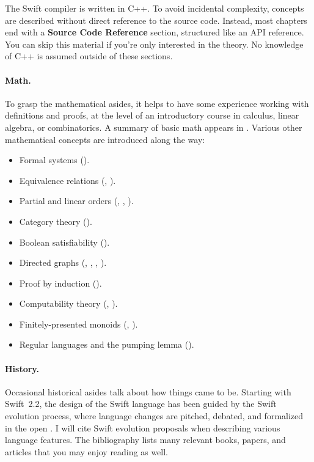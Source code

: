 \documentclass[../generics]{subfiles}
\begin{document}
The Swift compiler is written in C++. To avoid incidental complexity, concepts are described without direct reference to the source code. Instead, most chapters end with a \textbf{Source Code Reference} section, structured like an API reference. You can skip this material if you're only interested in the theory. No knowledge of C++ is assumed outside of these sections.

\paragraph{Math.}
To grasp the mathematical asides, it helps to have some experience working with definitions and proofs, at the level of an introductory course in calculus, linear algebra, or combinatorics. A summary of basic math appears in . Various other mathematical concepts are introduced along the way:
\begin{itemize}
\item Formal systems ().
\item Equivalence relations (, ).
\item Partial and linear orders (, , ).
\item Category theory ().
\item Boolean satisfiability ().
\item Directed graphs (, , , ).
\item Proof by induction ().
\item Computability theory (, ).
\item Finitely-presented monoids (, ).
\item Regular languages and the pumping lemma ().
\end{itemize}

\paragraph{History.}
Occasional historical asides talk about how things came to be. Starting with Swift~2.2, the design of the Swift language has been guided by the Swift evolution process, where language changes are pitched, debated, and formalized in the open \cite{evolution}. I will cite Swift evolution proposals when describing various language features. The bibliography lists many relevant books, papers, and articles that you may enjoy reading as well.
\end{document}
